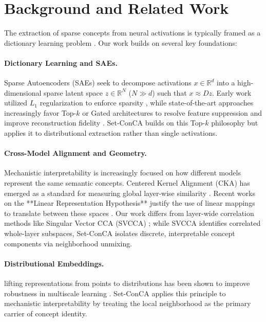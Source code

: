\documentclass{article}
\begin{document}
\section{Background and Related Work}
\label{sec:background}
The extraction of sparse concepts from neural activations is typically framed as a dictionary learning problem \citep{cunningham2024sae}. Our work builds on several key foundations:

\paragraph{Dictionary Learning and SAEs.} Sparse Autoencoders (SAEs) seek to decompose activations $x \in \mathbb{R}^d$ into a high-dimensional sparse latent space $z \in \mathbb{R}^N$ ($N \gg d$) such that $x \approx Dz$. Early work utilized $L_1$ regularization to enforce sparsity \citep{bricken2023monosemanticity}, while state-of-the-art approaches increasingly favor Top-$k$ or Gated architectures to resolve feature suppression and improve reconstruction fidelity \citep{bussmann2024batchtopk, gao2024scaling_sae, anthropic2024scalingmonosemanticity}. Set-ConCA builds on this Top-$k$ philosophy but applies it to distributional extraction rather than single activations.

\paragraph{Cross-Model Alignment and Geometry.} Mechanistic interpretability is increasingly focused on how different models represent the same semantic concepts. Centered Kernel Alignment (CKA) has emerged as a standard for measuring global layer-wise similarity \citep{pmlr-v97-kornblith19a}. Recent works on the **Linear Representation Hypothesis** justify the use of linear mappings to translate between these spaces \citep{pmlr-v235-park24c}. Our work differs from layer-wide correlation methods like Singular Vector CCA (SVCCA) \citep{NIPS2017_7185}; while SVCCA identifies correlated whole-layer subspaces, Set-ConCA isolates discrete, interpretable concept components via neighborhood unmixing.

\paragraph{Distributional Embeddings.} lifting representations from points to distributions has been shown to improve robustness in multiscale learning \citep{fishman2025gde}. Set-ConCA applies this principle to mechanistic interpretability by treating the local neighborhood as the primary carrier of concept identity.
\end{document}
